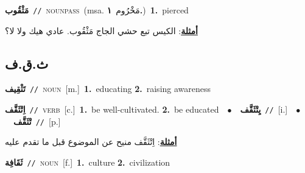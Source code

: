 \documentclass[10pt,a4paper,twoside]{article} %
\begin{document}
\begin{multicols}{2}
{{{{{{\setlength\topsep{0pt}\textbf{\foreignlanguage{arabic}{مَثْقُوب}}\ {\color{gray}\texttt{//}\color{black}}\ \textsc{noun\textunderscore pass}\ \color{gray}(msa. \foreignlanguage{arabic}{مَخْرُوم}~\foreignlanguage{arabic}{\textbf{١.}})\color{black}\ \textbf{1.}~pierced\  \begin{flushright}\color{gray}\foreignlanguage{arabic}{\textbf{\underline{\foreignlanguage{arabic}{أمثلة}}}: الكيس تبع حشي الجاج مَثْقُوب. عادي هيك ولا لا؟}\end{flushright}\color{black}} \vspace{2mm}

\vspace{-3mm}
\subsection*{\color{blue}\foreignlanguage{arabic}{ث.ق.ف}\color{blue}{}} 

{\setlength\topsep{0pt}\textbf{\foreignlanguage{arabic}{تَثْقِيف}}\ {\color{gray}\texttt{//}\color{black}}\ \textsc{noun}\ [m.]\ \textbf{1.}~educating  \textbf{2.}~raising awareness\ 

{\setlength\topsep{0pt}\textbf{\foreignlanguage{arabic}{اِتْثَقَّف}}\ {\color{gray}\texttt{//}\color{black}}\ \textsc{verb}\ [c.]\ \textbf{1.}~be well-cultivated.  \textbf{2.}~be educated\ \ $\bullet$\ \ \setlength\topsep{0pt}\textbf{\foreignlanguage{arabic}{يِتْثَقَّف}}\ {\color{gray}\texttt{//}\color{black}}\ [i.]\ \ $\bullet$\ \ \setlength\topsep{0pt}\textbf{\foreignlanguage{arabic}{تْثَقَّف}}\ {\color{gray}\texttt{//}\color{black}}\ [p.]\  \begin{flushright}\color{gray}\foreignlanguage{arabic}{\textbf{\underline{\foreignlanguage{arabic}{أمثلة}}}: اِتْثَقَّف منيح عن الموضوع قبل ما تقدم عليه}\end{flushright}\color{black}} \vspace{2mm}

{\setlength\topsep{0pt}\textbf{\foreignlanguage{arabic}{ثَقَافِة}}\ {\color{gray}\texttt{//}\color{black}}\ \textsc{noun}\ [f.]\ \textbf{1.}~culture  \textbf{2.}~civilization\ 

}}}}}}}
\end{multicols}
\end{document}
